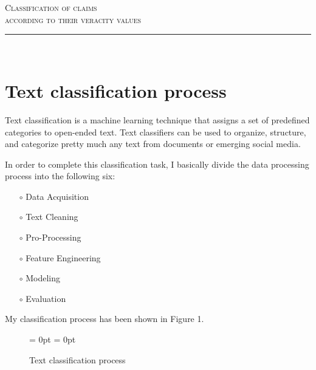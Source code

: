\documentclass[12pt]{article}
\begin{document}
\newcommand{\HRule}{\rule{\linewidth}{0.125mm}}

\center
 
{ \Huge \textsc{Classification of claims\\[0.4cm] according to their veracity values}}\\[0.4cm]
\HRule \\

\justify

\section{Text classification process}
Text classification is a machine learning technique that assigns a set of predefined categories to open-ended text. Text classifiers can be used to organize, structure, and categorize pretty much any text from documents or emerging social media.

In order to complete this classification task, I basically divide the data processing process into the following six:

\begin{itemize}
	\item[$\circ$] Data Acquisition
	\item[$\circ$] Text Cleaning
	\item[$\circ$] Pro-Processing
	\item[$\circ$] Feature Engineering
	\item[$\circ$] Modeling
	\item[$\circ$] Evaluation
\end{itemize}

My classification process has been shown in Figure 1.

\begin{figure}[hbtp]
	\centering \fboxrule = 0pt \fboxsep = 0pt 
	\caption{Text classification process}
\end{figure}
\end{document}
